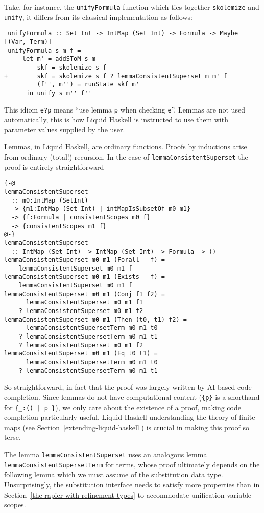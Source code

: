 \documentclass[sigconf]{acmart}
\newcommand{\tc}[1]{{\small\texttt{#1}}}
\begin{document}
Take, for instance, the \tc{unifyFormula} function which ties together
\tc{skolemize} and \tc{unify}, it differs from its classical implementation as
follows:

\begin{verbatim}
 unifyFormula :: Set Int -> IntMap (Set Int) -> Formula -> Maybe [(Var, Term)]
 unifyFormula s m f =
     let m' = addSToM s m
-        skf = skolemize s f
+        skf = skolemize s f ? lemmaConsistentSuperset m m' f
         (f'', m'') = runState skf m'
      in unify s m'' f''
\end{verbatim}

This idiom \tc{e?p} means ``use lemma \tc{p} when checking \tc{e}''.
Lemmas are not used automatically, this is how Liquid
Haskell is instructed to use them with parameter values supplied by the user.

Lemmas, in Liquid Haskell, are ordinary functions. Proofs by inductions arise
from ordinary (total!) recursion. In the case of \tc{lemmaConsistentSuperset}
the proof is entirely straightforward

\begin{verbatim}
{-@
lemmaConsistentSuperset
  :: m0:IntMap (SetInt)
  -> {m1:IntMap (Set Int) | intMapIsSubsetOf m0 m1}
  -> {f:Formula | consistentScopes m0 f}
  -> {consistentScopes m1 f}
@-}
lemmaConsistentSuperset
  :: IntMap (Set Int) -> IntMap (Set Int) -> Formula -> ()
lemmaConsistentSuperset m0 m1 (Forall _ f) =
    lemmaConsistentSuperset m0 m1 f
lemmaConsistentSuperset m0 m1 (Exists _ f) =
    lemmaConsistentSuperset m0 m1 f
lemmaConsistentSuperset m0 m1 (Conj f1 f2) =
      lemmaConsistentSuperset m0 m1 f1
    ? lemmaConsistentSuperset m0 m1 f2
lemmaConsistentSuperset m0 m1 (Then (t0, t1) f2) =
      lemmaConsistentSupersetTerm m0 m1 t0
    ? lemmaConsistentSupersetTerm m0 m1 t1
    ? lemmaConsistentSuperset m0 m1 f2
lemmaConsistentSuperset m0 m1 (Eq t0 t1) =
      lemmaConsistentSupersetTerm m0 m1 t0
    ? lemmaConsistentSupersetTerm m0 m1 t1
\end{verbatim}

So straightforward, in fact that the proof was largely written by AI-based code
completion. Since lemmas do not have computational content (\tc{\{p\}} is a
shorthand for \tc{\{\_:() | p \}}), we only care about the existence of a
proof, making code completion particularly useful. Liquid Haskell understanding
the theory of finite maps (see Section~\ref{extending-liquid-haskell}) is crucial in
making this proof so terse.

The lemma \tc{lemmaConsistentSuperset} uses an analogous lemma \tc{lemma\-Consistent\-Superset\-Term} for terms,
whose proof ultimately depends on the following lemma which we must assume of the substitution data type.
Unsurprisingly, the substitution interface needs to satisfy more properties
than in Section~\ref{the-rapier-with-refinement-types} to accommodate
unification variable scopes.
\end{document}
